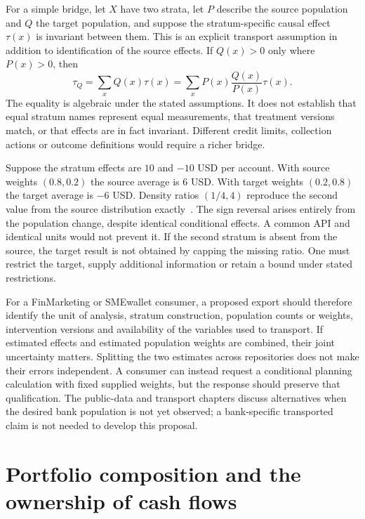 For a simple bridge, let $X$ have two strata, let $P$ describe the source
population and $Q$ the target population, and suppose the stratum-specific
causal effect $\tau(x)$ is invariant between them. This is an explicit
transport assumption in addition to identification of the source effects.
If $Q(x)>0$ only where $P(x)>0$, then
\begin{equation}
 \tau_Q=\sum_xQ(x)\tau(x)
       =\sum_xP(x)\frac{Q(x)}{P(x)}\tau(x).
 \label{exec13:i3-transport}
\end{equation}
The equality is algebraic under the stated assumptions. It does not establish
that equal stratum names represent equal measurements, that treatment versions
match, or that effects are in fact invariant. Different credit limits,
collection actions or outcome definitions would require a richer bridge.

Suppose the stratum effects are $10$ and $-10$ USD per account. With source
weights $(0.8,0.2)$ the source average is $6$ USD. With target weights
$(0.2,0.8)$ the target average is $-6$ USD. Density ratios $(1/4,4)$
reproduce the second value from the source distribution exactly~\citep{exec13_i3_composition}. The sign reversal arises entirely from the
population change, despite identical conditional effects. A common API and
identical units would not prevent it. If the second stratum is absent from
the source, the target result is not obtained by capping the missing ratio.
One must restrict the target, supply additional information or retain a bound
under stated restrictions.

For a FinMarketing or SMEwallet consumer, a proposed export should therefore
identify the unit of analysis, stratum construction, population counts or
weights, intervention versions and availability of the variables used to
transport. If estimated effects and estimated population weights are combined,
their joint uncertainty matters. Splitting the two estimates across
repositories does not make their errors independent. A consumer can instead
request a conditional planning calculation with fixed supplied weights, but
the response should preserve that qualification. The public-data and transport
chapters discuss alternatives when the desired bank population is not yet
observed; a bank-specific transported claim is not needed to develop this
proposal.

\section{Portfolio composition and the ownership of cash flows}

